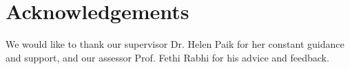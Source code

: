 \chapter*{Acknowledgements}\label{ack}

We would like to thank our supervisor Dr. Helen Paik for her constant guidance and support, and our assessor Prof. Fethi Rabhi for his advice and feedback. 